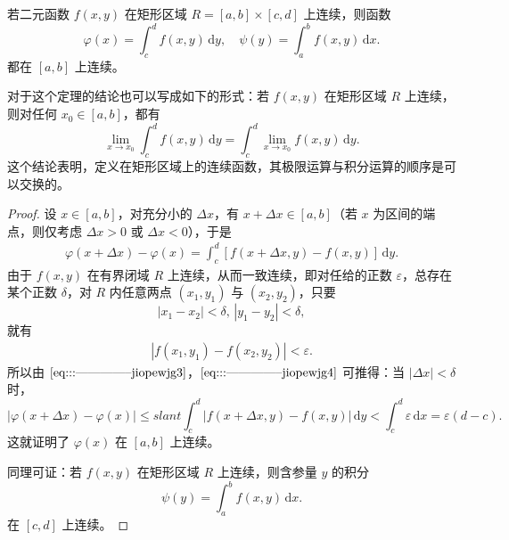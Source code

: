 \documentclass[../../main.tex]{subfiles}
\begin{document}
\begin{theorem}[连续性]\label{theorem:含参量积分的连续性}
若二元函数 \( f(x,y) \) 在矩形区域 \( R = [a,b] \times [c,d] \) 上连续，则函数
\[
\varphi(x) = \int_{c}^{d} f(x,y) \, \mathrm{d}y,\quad \psi(y) = \int_{a}^{b} f(x,y) \, \mathrm{d}x .
\]
都在 \( [a,b] \) 上连续。
\end{theorem}
\begin{remark}
对于这个定理的结论也可以写成如下的形式：若 \( f(x,y) \) 在矩形区域 \( R \) 上连续，则对任何 \( x_0 \in [a,b] \)，都有
\[
\lim_{x \to x_0} \int_{c}^{d} f(x,y) \, \mathrm{d}y = \int_{c}^{d} \lim_{x \to x_0} f(x,y) \, \mathrm{d}y.
\]
这个结论表明，定义在矩形区域上的连续函数，其极限运算与积分运算的顺序是可以交换的。
\end{remark}
\begin{proof}
设 \( x \in [a,b] \)，对充分小的 \( \Delta x \)，有 \( x + \Delta x \in [a,b] \)（若 \( x \) 为区间的端点，则仅考虑 \( \Delta x > 0 \) 或 \( \Delta x < 0 \)），于是
\begin{align}
\varphi(x + \Delta x) - \varphi(x) = \int_{c}^{d} [f(x + \Delta x,y) - f(x,y)] \, \mathrm{d}y. \label{eq:::--------------jiopewjg3}
\end{align}
由于 \( f(x,y) \) 在有界闭域 \( R \) 上连续，从而一致连续，即对任给的正数 \( \varepsilon \)，总存在某个正数 \( \delta \)，对 \( R \) 内任意两点 \( (x_1,y_1) \) 与 \( (x_2,y_2) \)，只要
\[
|x_1 - x_2| < \delta, \, |y_1 - y_2| < \delta,
\]
就有
\begin{align}
|f(x_1,y_1) - f(x_2,y_2)| < \varepsilon.\label{eq:::--------------jiopewjg4}
\end{align}
所以由 \(\eqref{eq:::--------------jiopewjg3}\)，\(\eqref{eq:::--------------jiopewjg4}\) 可推得：当 \( |\Delta x| < \delta \) 时，
\[
|\varphi(x + \Delta x) - \varphi(x)| \leqslant slant \int_{c}^{d} |f(x + \Delta x,y) - f(x,y)| \, \mathrm{d}y
< \int_{c}^{d} \varepsilon \, \mathrm{d}x = \varepsilon(d - c).
\]
这就证明了 \( \varphi(x) \) 在 \( [a,b] \) 上连续。

同理可证：若 \( f(x,y) \) 在矩形区域 \( R \) 上连续，则含参量 \( y \) 的积分
\[
\psi(y) = \int_{a}^{b} f(x,y) \, \mathrm{d}x .
\]
在 \( [c,d] \) 上连续。
\end{proof}
\end{document}
